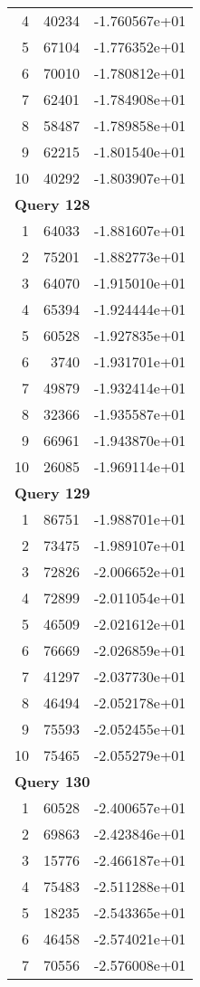 \begin{longtable}[{p}]{@{}rrp{}@{}}
4 & 40234 & -1.760567e+01 \\
5 & 67104 & -1.776352e+01 \\
6 & 70010 & -1.780812e+01 \\
7 & 62401 & -1.784908e+01 \\
8 & 58487 & -1.789858e+01 \\
9 & 62215 & -1.801540e+01 \\
10 & 40292 & -1.803907e+01 \\
\midrule
\multicolumn{3}{l}{\bfseries Query 128} \\
1 & 64033 & -1.881607e+01 \\
2 & 75201 & -1.882773e+01 \\
3 & 64070 & -1.915010e+01 \\
4 & 65394 & -1.924444e+01 \\
5 & 60528 & -1.927835e+01 \\
6 & 3740 & -1.931701e+01 \\
7 & 49879 & -1.932414e+01 \\
8 & 32366 & -1.935587e+01 \\
9 & 66961 & -1.943870e+01 \\
10 & 26085 & -1.969114e+01 \\
\midrule
\multicolumn{3}{l}{\bfseries Query 129} \\
1 & 86751 & -1.988701e+01 \\
2 & 73475 & -1.989107e+01 \\
3 & 72826 & -2.006652e+01 \\
4 & 72899 & -2.011054e+01 \\
5 & 46509 & -2.021612e+01 \\
6 & 76669 & -2.026859e+01 \\
7 & 41297 & -2.037730e+01 \\
8 & 46494 & -2.052178e+01 \\
9 & 75593 & -2.052455e+01 \\
10 & 75465 & -2.055279e+01 \\
\midrule
\multicolumn{3}{l}{\bfseries Query 130} \\
1 & 60528 & -2.400657e+01 \\
2 & 69863 & -2.423846e+01 \\
3 & 15776 & -2.466187e+01 \\
4 & 75483 & -2.511288e+01 \\
5 & 18235 & -2.543365e+01 \\
6 & 46458 & -2.574021e+01 \\
7 & 70556 & -2.576008e+01 \\

\end{longtable}
